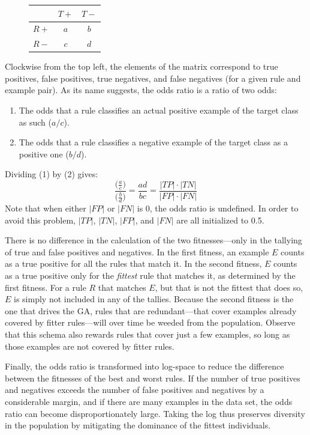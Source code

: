 \documentclass[12pt,twoside]{article}
\begin{document}
\begin{figure}[h!]
\centering
\begin{tabular}{c|cc}
& $T+$ & $T-$ \\
\hline
$R+$ & $a$ & $b$ \\
$R-$ & $c$ & $d$ \\
\end{tabular}
\label{odds_ratio}
\end{figure}

Clockwise from the top left, the elements of the matrix correspond to true positives, false positives, true negatives, and false negatives (for a given rule and example pair). As its name suggests, the odds ratio is a ratio of two odds:

\begin{enumerate}
\item The odds that a rule classifies an actual positive example of the target class as such ($a/c$).
\item The odds that a rule classifies a negative example of the target class as a positive one ($b/d$).
\end{enumerate}
Dividing (1) by (2) gives:
$$\frac{\Big(\frac{a}{c}\Big)}{\Big(\frac{b}{d}\Big)} = \frac{ad}{bc} = \frac{|TP| \cdot |TN|}{|FP| \cdot |FN|}$$
Note that when either $|FP|$ or $|FN|$ is 0, the odds ratio is undefined. In order to avoid this problem, $|TP|$, $|TN|$, $|FP|$, and $|FN|$ are all initialized to 0.5.

There is no difference in the calculation of the two fitnesses---only in the tallying of true and false positives and negatives. In the first fitness, an example $E$ counts as a true positive for all the rules that match it. In the second fitness, $E$ counts as a true positive only for the \emph{fittest} rule that matches it, as determined by the first fitness. For a rule $R$ that matches $E$, but that is not the fittest that does so, $E$ is simply not included in any of the tallies. Because the second fitness is the one that drives the GA, rules that are redundant---that cover examples already covered by fitter rules---will over time be weeded from the population. Observe that this schema also rewards rules that cover just a few examples, so long as those examples are not covered by fitter rules.

Finally, the odds ratio is transformed into log-space to reduce the difference between the fitnesses of the best and worst rules. If the number of true positives and negatives exceeds the number of false positives and negatives by a considerable margin, and if there are many examples in the data set, the odds ratio can become disproportionately large. Taking the log thus preserves diversity in the population by mitigating the dominance of the fittest individuals.
\end{document}
